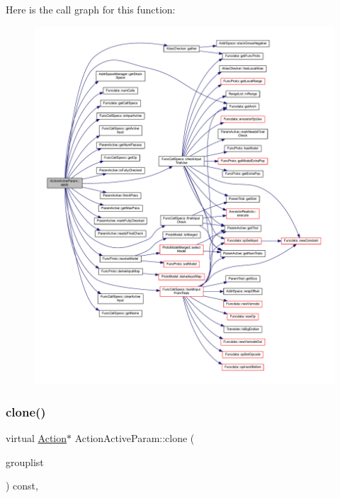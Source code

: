 Here is the call graph for this function\+:
\nopagebreak
\begin{figure}[H]
\begin{center}
\leavevmode
\includegraphics[width=350pt]{class_action_active_param_ab4bc14613f94c7114c1890d436c4d729_cgraph}
\end{center}
\end{figure}
\mbox{\label{class_action_active_param_ae7135b6adc5448d7d03d4280bc12d610}} 
\subsubsection{\texorpdfstring{clone()}{clone()}}
{\footnotesize\ttfamily virtual \mbox{\hyperlink{class_action}{Action}}$\ast$ Action\+Active\+Param\+::clone (\begin{DoxyParamCaption}\item[{const \mbox{\hyperlink{class_action_group_list}{Action\+Group\+List}} \&}]{grouplist }\end{DoxyParamCaption}) const\hspace{0.3cm}{\ttfamily [inline]}, {\ttfamily [virtual]}}



